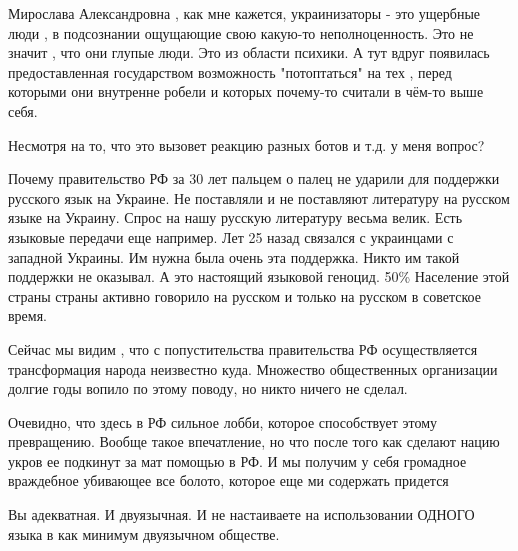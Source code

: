 \begin{itemize}
Мирослава Александровна , как мне кажется, украинизаторы - это ущербные люди ,
в подсознании ощущающие свою какую-то неполноценность. Это не значит , что они
глупые люди. Это из области психики. А тут вдруг появилась предоставленная
государством возможность "потоптаться" на тех , перед которыми они внутренне
робели и которых почему-то считали в чём-то выше себя.


 

Несмотря на то, что это вызовет реакцию разных ботов и т.д. у меня вопрос?

Почему правительство РФ за 30 лет пальцем о палец не ударили для поддержки
русского язык на Украине. Не поставляли и не поставляют литературу на русском
языке на Украину. Спрос на нашу русскую литературу весьма велик. Есть языковые
передачи еще например. Лет 25 назад связался с украинцами с западной Украины.
Им нужна была очень эта поддержка. Никто им такой поддержки не оказывал. А это
настоящий языковой геноцид. 50\% Население этой страны страны активно говорило
на русском и только на русском в советское время. 

Сейчас мы видим , что с попустительства правительства РФ осуществляется
трансформация народа неизвестно куда. Множество общественных организации долгие
годы вопило по этому поводу, но никто ничего не сделал. 

Очевидно, что здесь в РФ сильное лобби, которое способствует этому превращению.
Вообще такое впечатление, но что после того как сделают нацию укров ее подкинут
за мат помощью в РФ. И мы получим у себя громадное враждебное убивающее все
болото, которое еще ми содержать придется


 
Вы адекватная. И двуязычная. И не настаиваете на использовании ОДНОГО языка в как минимум двуязычном обществе.

\begin{itemize}
 


\end{itemize}
\end{itemize}
